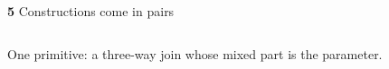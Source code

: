 \begin{frame}{\textbf{5}\; Constructions come in pairs}
\begin{columns}[c]
\begin{column}{0.56\textwidth}
One primitive: a three-way join whose \alert{mixed} part is the parameter.
\renewcommand{\AgdaCodeStyle}{\footnotesize}
\begin{code}%
\>[0]\AgdaSpace{}%
%
\>[40I]\AgdaSymbol{(}\AgdaSpace{}%
\AgdaSymbol{:}\AgdaSpace{}%
\AgdaSpace{}%
\AgdaSymbol{)}\AgdaSpace{}%
\AgdaSymbol{(}\AgdaSpace{}%
\AgdaSymbol{:}\AgdaSpace{}%
\AgdaSpace{}%
\AgdaSymbol{)}\AgdaSpace{}%
\AgdaSymbol{(}\AgdaSpace{}%
\AgdaSymbol{:}\AgdaSpace{}%
\AgdaSpace{}%
\AgdaSymbol{(}\AgdaSpace{}%
\AgdaSpace{}%
\AgdaSymbol{))}\<%
\\
\>[.][@{}l@{}]\<[40I]%
\>[11]\AgdaSymbol{:}\AgdaSpace{}%
\AgdaSpace{}%
\AgdaSymbol{(}\AgdaSpace{}%
\AgdaSpace{}%
\AgdaSymbol{)}\AgdaSpace{}%
\<%
\\
\>[0][@{}l@{\AgdaIndent{0}}]%
\>[2]%
\>[8]\AgdaSymbol{:}\AgdaSpace{}%
\AgdaSpace{}%
\AgdaSpace{}%
\AgdaSpace{}%
\AgdaSpace{}%
\AgdaSymbol{(}\AgdaSpace{}%
\AgdaSpace{}%
\AgdaSpace{}%
\AgdaSpace{}%
\AgdaSymbol{)}\AgdaSpace{}%
\AgdaOperator{\AgdaFunction{[}}\AgdaSpace{}%
\AgdaSpace{}%
\AgdaOperator{\AgdaFunction{]ₗ}}\AgdaSpace{}%
\AgdaOperator{\AgdaFunction{[}}\AgdaSpace{}%
\AgdaSpace{}%
\AgdaOperator{\AgdaFunction{]ₗ}}\<%
\\
%
\>[2]\AgdaSpace{}%
\AgdaSymbol{:}\AgdaSpace{}%
\AgdaSpace{}%
\AgdaSpace{}%
\AgdaSpace{}%
\AgdaSpace{}%
\AgdaSymbol{(}\AgdaSpace{}%
\AgdaSpace{}%
\AgdaSpace{}%
\AgdaSpace{}%
\AgdaSymbol{)}\AgdaSpace{}%
\AgdaOperator{\AgdaFunction{[}}\AgdaSpace{}%
\AgdaSpace{}%
\AgdaOperator{\AgdaFunction{]ᵣ}}\AgdaSpace{}%

\end{code}
\end{column}
\end{columns}
\end{frame}
